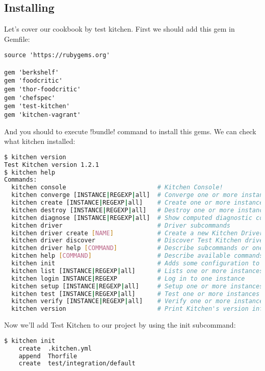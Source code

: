 \subsection{Installing}

Let's cover our cookbook by test kitchen. First we should add this gem in Gemfile:

\begin{lstlisting}[label=lst:testing-test-kitchen1]
source 'https://rubygems.org'

gem 'berkshelf'
gem 'foodcritic'
gem 'thor-foodcritic'
gem 'chefspec'
gem 'test-kitchen'
gem 'kitchen-vagrant'
\end{lstlisting}

And you should to execute \inline!bundle! command to install this gems. We can check what kitchen installed:

\begin{lstlisting}[language=Bash,label=lst:testing-test-kitchen2]
$ kitchen version
Test Kitchen version 1.2.1
$ kitchen help
Commands:
  kitchen console                         # Kitchen Console!
  kitchen converge [INSTANCE|REGEXP|all]  # Converge one or more instances
  kitchen create [INSTANCE|REGEXP|all]    # Create one or more instances
  kitchen destroy [INSTANCE|REGEXP|all]   # Destroy one or more instances
  kitchen diagnose [INSTANCE|REGEXP|all]  # Show computed diagnostic configuration
  kitchen driver                          # Driver subcommands
  kitchen driver create [NAME]            # Create a new Kitchen Driver gem project
  kitchen driver discover                 # Discover Test Kitchen drivers published on RubyGems
  kitchen driver help [COMMAND]           # Describe subcommands or one specific subcommand
  kitchen help [COMMAND]                  # Describe available commands or one specific command
  kitchen init                            # Adds some configuration to your cookbook so Kitchen can rock
  kitchen list [INSTANCE|REGEXP|all]      # Lists one or more instances
  kitchen login INSTANCE|REGEXP           # Log in to one instance
  kitchen setup [INSTANCE|REGEXP|all]     # Setup one or more instances
  kitchen test [INSTANCE|REGEXP|all]      # Test one or more instances
  kitchen verify [INSTANCE|REGEXP|all]    # Verify one or more instances
  kitchen version                         # Print Kitchen's version information
\end{lstlisting}

Now we'll add Test Kitchen to our project by using the init subcommand:

\begin{lstlisting}[language=Bash,label=lst:testing-test-kitchen3]
$ kitchen init
    create  .kitchen.yml
    append  Thorfile
    create  test/integration/default
\end{lstlisting}

